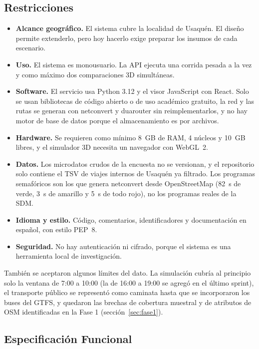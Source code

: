 \subsection{Restricciones}

\begin{itemize}[noitemsep]
    \item \textbf{Alcance geográfico.} El sistema cubre la localidad de Usaquén. El diseño permite extenderlo, pero hoy hacerlo exige preparar los insumos de cada escenario.
    \item \textbf{Uso.} El sistema es monousuario. La API ejecuta una corrida pesada a la vez y como máximo dos comparaciones 3D simultáneas.
    \item \textbf{Software.} El servicio usa Python 3.12 y el visor JavaScript con React. Solo se usan bibliotecas de código abierto o de uso académico gratuito, la red y las rutas se generan con netconvert y duarouter sin reimplementarlos, y no hay motor de base de datos porque el almacenamiento es por archivos.
    \item \textbf{Hardware.} Se requieren como mínimo 8~GB de RAM, 4 núcleos y 10~GB libres, y el simulador 3D necesita un navegador con WebGL~2.
    \item \textbf{Datos.} Los microdatos crudos de la encuesta no se versionan, y el repositorio solo contiene el TSV de viajes internos de Usaquén ya filtrado. Los programas semafóricos son los que genera netconvert desde OpenStreetMap (82~s de verde, 3~s de amarillo y 5~s de todo rojo), no los programas reales de la SDM.
    \item \textbf{Idioma y estilo.} Código, comentarios, identificadores y documentación en español, con estilo PEP~8.
    \item \textbf{Seguridad.} No hay autenticación ni cifrado, porque el sistema es una herramienta local de investigación.
\end{itemize}

También se aceptaron algunos límites del dato. La simulación cubría al principio solo la ventana de 7:00 a 10:00 (la de 16:00 a 19:00 se agregó en el último sprint), el transporte público se representó como caminata hasta que se incorporaron los buses del GTFS, y quedaron las brechas de cobertura muestral y de atributos de OSM identificadas en la Fase 1 (sección~\ref{sec:fase1}).

\subsection{Especificación Funcional}

